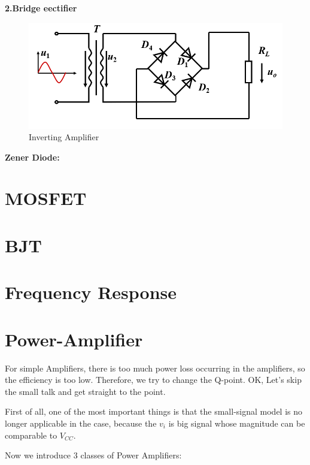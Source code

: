 \documentclass[a4paper,11pt,UTF8]{article}
\begin{document}
\textbf{\quad2.Bridge eectifier}
\begin{figure}[H] 
	\centering 
	\includegraphics[scale=0.4]{./img/2.3}
	\caption{Inverting Amplifier}
\end{figure}
\textbf{Zener Diode:}
\section{MOSFET}

\section{BJT}

\section{Frequency Response}

\section{Power-Amplifier}
For simple Amplifiers, there is too much power loss occurring in the amplifiers, so the efficiency is too low. Therefore, we try to change the Q-point. OK, Let's skip the small talk and get straight to the point.

First of all, one of the most important things is that the small-signal model is no longer applicable in the case, because the $v_i$ is big signal whose magnitude can be comparable to $V_{CC}$.

Now we introduce 3 classes of Power Amplifiers:
\end{document}
